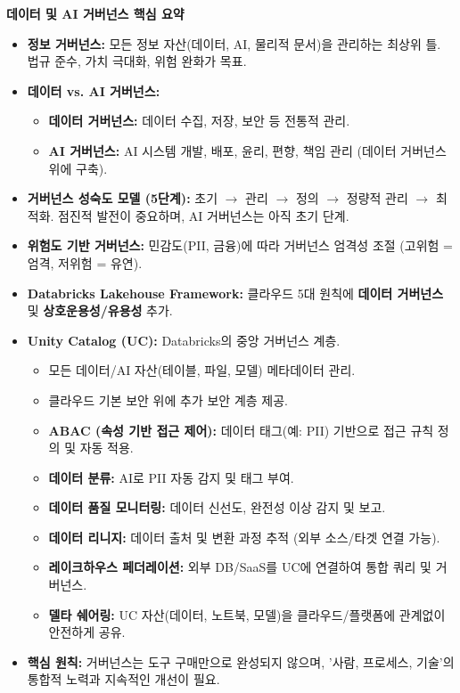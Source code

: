 \documentclass[11pt,a4paper]{article}
\begin{document}
\begin{tcolorbox}[summarybox]
\textbf{데이터 및 AI 거버넌스 핵심 요약}

\begin{itemize}
    \item \textbf{정보 거버넌스:} 모든 정보 자산(데이터, AI, 물리적 문서)을 관리하는 최상위 틀. 법규 준수, 가치 극대화, 위험 완화가 목표.
    \item \textbf{데이터 vs. AI 거버넌스:}
    \begin{itemize}
        \item \textbf{데이터 거버넌스:} 데이터 수집, 저장, 보안 등 전통적 관리.
        \item \textbf{AI 거버넌스:} AI 시스템 개발, 배포, 윤리, 편향, 책임 관리 (데이터 거버넌스 위에 구축).
    \end{itemize}
    \item \textbf{거버넌스 성숙도 모델 (5단계):} 초기 $\rightarrow$ 관리 $\rightarrow$ 정의 $\rightarrow$ 정량적 관리 $\rightarrow$ 최적화. 점진적 발전이 중요하며, AI 거버넌스는 아직 초기 단계.
    \item \textbf{위험도 기반 거버넌스:} 민감도(PII, 금융)에 따라 거버넌스 엄격성 조절 (고위험 = 엄격, 저위험 = 유연).
    \item \textbf{Databricks Lakehouse Framework:} 클라우드 5대 원칙에 \textbf{데이터 거버넌스} 및 \textbf{상호운용성/유용성} 추가.
    \item \textbf{Unity Catalog (UC):} Databricks의 중앙 거버넌스 계층.
    \begin{itemize}
        \item 모든 데이터/AI 자산(테이블, 파일, 모델) 메타데이터 관리.
        \item 클라우드 기본 보안 위에 추가 보안 계층 제공.
        \item \textbf{ABAC (속성 기반 접근 제어):} 데이터 태그(예: PII) 기반으로 접근 규칙 정의 및 자동 적용.
        \item \textbf{데이터 분류:} AI로 PII 자동 감지 및 태그 부여.
        \item \textbf{데이터 품질 모니터링:} 데이터 신선도, 완전성 이상 감지 및 보고.
        \item \textbf{데이터 리니지:} 데이터 출처 및 변환 과정 추적 (외부 소스/타겟 연결 가능).
        \item \textbf{레이크하우스 페더레이션:} 외부 DB/SaaS를 UC에 연결하여 통합 쿼리 및 거버넌스.
        \item \textbf{델타 쉐어링:} UC 자산(데이터, 노트북, 모델)을 클라우드/플랫폼에 관계없이 안전하게 공유.
    \end{itemize}
    \item \textbf{핵심 원칙:} 거버넌스는 도구 구매만으로 완성되지 않으며, '사람, 프로세스, 기술'의 통합적 노력과 지속적인 개선이 필요.
\end{itemize}
\end{tcolorbox}
\end{document}
